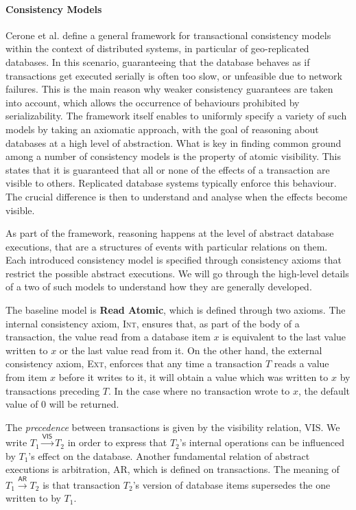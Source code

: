\paragraph{Consistency Models} Cerone et al. \cite{ceroneConcur15} define a general framework for transactional consistency models within the context of distributed systems, in particular of geo-replicated databases. In this scenario, guaranteeing that the database behaves as if transactions get executed serially is often too slow, or unfeasible due to network failures. This is the main reason why weaker consistency guarantees are taken into account, which allows the occurrence of behaviours prohibited by serializability. The framework itself enables to uniformly specify a variety of such models by taking an axiomatic approach, with the goal of reasoning about databases at a high level of abstraction. What is key in finding common ground among a number of consistency models is the property of atomic visibility. This states that it is guaranteed that all or none of the effects of a transaction are visible to others. Replicated database systems typically enforce this behaviour. The crucial difference is then to understand and analyse when the effects become visible.

As part of the framework, reasoning happens at the level of abstract database executions, that are a structures of events with particular relations on them. Each introduced consistency model is specified through consistency axioms that restrict the possible abstract executions. We will go through the high-level details of a two of such models to understand how they are generally developed.

The baseline model is \textbf{Read Atomic}, which is defined through two axioms. The internal consistency axiom, \textsc{Int}, ensures that, as part of the body of a transaction, the value read from a database item $x$ is equivalent to the last value written to $x$ or the last value read from it. On the other hand, the external consistency axiom, \textsc{Ext}, enforces that any time a transaction $T$ reads a value from item $x$ before it writes to it, it will obtain a value which was written to $x$ by transactions preceding $T$. In the case where no transaction wrote to $x$, the default value of $0$ will be returned.

The \textit{precedence} between transactions is given by the visibility relation, \textsf{VIS}. We write $T_1 \xrightarrow{\mathsf{VIS}} T_2$ in order to express that $T_2$'s internal operations can be influenced by $T_1$'s effect on the database. Another fundamental relation of abstract executions is arbitration, \textsf{AR}, which is defined on transactions. The meaning of $T_1 \xrightarrow{\mathsf{AR}} T_2$ is that transaction $T_2$'s version of database items supersedes the one written to by $T_1$.


